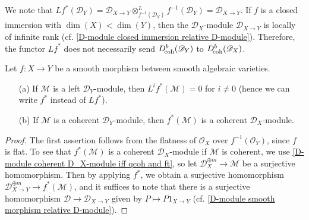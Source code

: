 \begin{remark}
We note that $Lf^*(\mathscr{D}_Y)=\mathscr{D}_{X\to Y}\otimes_{f^{-1}(\mathscr{D}_Y)}^Lf^{-1}(\mathscr{D}_Y)=\mathscr{D}_{X\to Y}$. If $f$ is a closed immersion with $\dim(X)<\dim(Y)$, then the $\mathscr{D}_X$-module $\mathscr{D}_{X\to Y}$ is locally of infinite rank (cf. \cref{D-module closed immersion relative D-module}). Therefore, the functor $Lf^*$ does not necessarily send $D_{\!\mathrm{coh}}^b(\mathscr{D}_Y)$ to $D_{\!\mathrm{coh}}^b(\mathscr{D}_X)$.
\end{remark}

\begin{proposition}\label{D-module derived inverse image of smooth morphism prop}
Let $f:X\to Y$ be a smooth morphism between smooth algebraic varieties.
\begin{enumerate}
    \item[(a)] If $\mathscr{M}$ is a left $\mathscr{D}_Y$-module, then $L^if^*(\mathscr{M})=0$ for $i\neq 0$ (hence we can write $f^*$ instead of $Lf^*$).
    \item[(b)] If $\mathscr{M}$ is a coherent $\mathscr{D}_Y$-module, then $f^*(\mathscr{M})$ is a coherent $\mathscr{D}_X$-module.
\end{enumerate}
\end{proposition}
\begin{proof}
The first assertion follows from the flatness of $\mathscr{O}_X$ over $f^{-1}(\mathscr{O}_Y)$, since $f$ is flat. To see that $f^*(\mathscr{M})$ is a coherent $\mathscr{D}_X$-module if $\mathscr{M}$ is coherent, we use \cref{D-module coherent D_X-module iff qcoh and ft}, so let $\mathscr{D}_X^{\oplus m}\to\mathscr{M}$ be a surjective homomorphism. Then by applying $f^*$, we obtain a surjective homomorphism $\mathscr{D}_{X\to Y}^{\oplus m}\to f^*(\mathscr{M})$, and it suffices to note that there is a surjective homomorphism $\mathscr{D}\to\mathscr{D}_{X\to Y}$ given by $P\mapsto P1_{X\to Y}$ (cf. \cref{D-module smooth morphism relative D-module}).
\end{proof}

